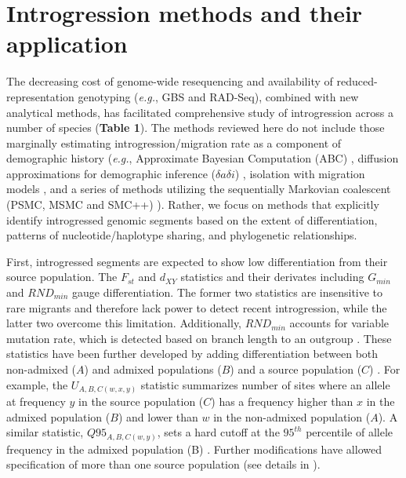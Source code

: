 \documentclass[11pt]{article}
\begin{document}
\section*{Introgression methods and their application}


The decreasing cost of genome-wide resequencing and availability of reduced-representation genotyping (\emph{e.g.}, GBS and RAD-Seq), combined with new analytical methods, has facilitated comprehensive study of introgression across a number of species (\textbf{Table 1}). 
The methods reviewed here do not include those marginally estimating introgression\slash migration rate as a component of demographic history (\emph{e.g.}, Approximate Bayesian Computation (ABC) \cite{beaumont2002}, diffusion approximations for demographic inference ($\delta a\delta i$) \cite{gutenkunst2009}, isolation with migration models \cite{hey2004}, and a series of methods utilizing the sequentially Markovian coalescent (PSMC, MSMC and SMC++) \cite{li2011, schiffels2014, terhorst2017}). 
Rather, we focus on methods that explicitly identify introgressed genomic segments based on the extent of differentiation, patterns of nucleotide/haplotype sharing, and phylogenetic relationships.

First, introgressed segments are expected to show low differentiation from their source population.
The $F_{st}$ and $d_{XY}$ statistics and their derivates including $G_{min}$ \cite{geneva2015} and $RND_{min}$\cite{rosenzweig2016} gauge differentiation. 
The former two statistics are insensitive to rare migrants and therefore lack power to detect recent introgression, while the latter two overcome this limitation.
Additionally, $RND_{min}$ accounts for variable mutation rate, which is detected based on branch length to an outgroup \cite{rosenzweig2016}.
These statistics have been further developed by adding differentiation between both non-admixed ($A$) and admixed populations ($B$) and a source population ($C$) \cite{racimo2016}. 
For example, the $U_{A,B,C(w,x,y)}$ statistic summarizes number of sites where an allele at frequency $y$ in the source population ($C$) has a frequency higher than $x$ in the admixed population ($B$) and lower than $w$ in the non-admixed population ($A$).
A similar statistic, $Q95_{A,B,C(w,y)}$, sets a hard cutoff at the $95^{th}$ percentile of allele frequency in the admixed population (B) \cite{racimo2016}.
Further modifications have allowed specification of more than one source population (see details in \cite{racimo2016}).
 
\end{document}
